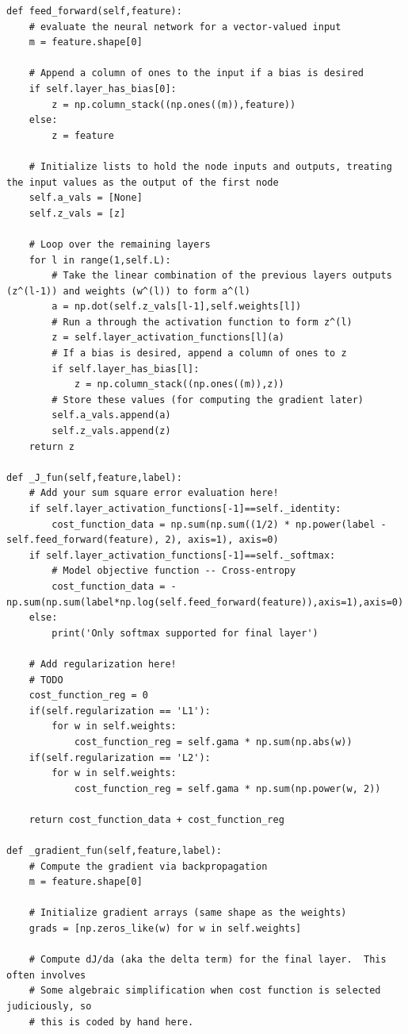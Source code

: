 \documentclass[12pt]{article}
\begin{document}
\begin{flushleft}
\begin{lstlisting}
def feed_forward(self,feature):
	# evaluate the neural network for a vector-valued input
	m = feature.shape[0]

	# Append a column of ones to the input if a bias is desired
	if self.layer_has_bias[0]:
		z = np.column_stack((np.ones((m)),feature))
	else:
		z = feature
	
	# Initialize lists to hold the node inputs and outputs, treating the input values as the output of the first node
	self.a_vals = [None]
	self.z_vals = [z]
	
	# Loop over the remaining layers
	for l in range(1,self.L):
		# Take the linear combination of the previous layers outputs (z^(l-1)) and weights (w^(l)) to form a^(l)
		a = np.dot(self.z_vals[l-1],self.weights[l])
		# Run a through the activation function to form z^(l)
		z = self.layer_activation_functions[l](a) 
		# If a bias is desired, append a column of ones to z
		if self.layer_has_bias[l]:         
			z = np.column_stack((np.ones((m)),z))
		# Store these values (for computing the gradient later)
		self.a_vals.append(a) 
		self.z_vals.append(z)
	return z

def _J_fun(self,feature,label):
	# Add your sum square error evaluation here!
	if self.layer_activation_functions[-1]==self._identity:
		cost_function_data = np.sum(np.sum((1/2) * np.power(label - self.feed_forward(feature), 2), axis=1), axis=0)
	if self.layer_activation_functions[-1]==self._softmax:
		# Model objective function -- Cross-entropy 
		cost_function_data = -np.sum(np.sum(label*np.log(self.feed_forward(feature)),axis=1),axis=0)
	else:
		print('Only softmax supported for final layer')            
	
	# Add regularization here!
	# TODO
	cost_function_reg = 0
	if(self.regularization == 'L1'):
		for w in self.weights:
			cost_function_reg = self.gama * np.sum(np.abs(w))
	if(self.regularization == 'L2'):
		for w in self.weights:
			cost_function_reg = self.gama * np.sum(np.power(w, 2))
	
	return cost_function_data + cost_function_reg

def _gradient_fun(self,feature,label):
	# Compute the gradient via backpropagation
	m = feature.shape[0]
	
	# Initialize gradient arrays (same shape as the weights)
	grads = [np.zeros_like(w) for w in self.weights]
	
	# Compute dJ/da (aka the delta term) for the final layer.  This often involves 
	# Some algebraic simplification when cost function is selected judiciously, so
	# this is coded by hand here.
	

\end{lstlisting}
\end{flushleft}
\end{document}
